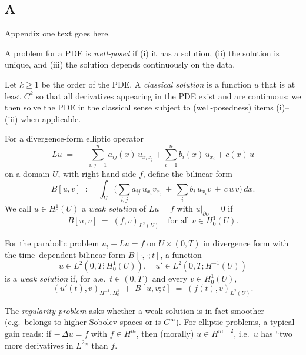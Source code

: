 \begin{appendices}
\chapter{A}
Appendix one text goes here.

\begin{definition}
A problem for a PDE is \emph{well-posed} if (i) it has a solution, (ii) the solution is unique, and (iii) the solution depends continuously on the data. 
\end{definition}

\begin{definition}
Let $k\ge 1$ be the order of the PDE. A \emph{classical solution} is a function $u$ that is at least $C^k$ so that all derivatives appearing in the PDE exist and are continuous; we then solve the PDE in the classical sense subject to (well-posedness) items (i)–(iii) when applicable.
\end{definition}

\begin{definition}
For a divergence-form elliptic operator 
\[
L u \;=\; -\sum_{i,j=1}^n a_{ij}(x)\,u_{x_i x_j} + \sum_{i=1}^n b_i(x)\,u_{x_i} + c(x)\,u
\]
on a domain $U$, with right-hand side $f$, define the bilinear form
\[
B[u,v] \;:=\; \int_U \Big(\sum_{i,j} a_{ij}\,u_{x_i} v_{x_j} \,+\, \sum_i b_i\,u_{x_i} v \,+\, c\,u\,v\Big)\,dx.
\]
We call $u\in H_0^{1}(U)$ a \emph{weak solution} of $Lu=f$ with $u|_{\partial U}=0$ if
\[
B[u,v] \;=\; (f,v)_{L^2(U)} \quad \text{for all } v\in H_0^{1}(U).
\]
\end{definition}

\begin{definition}
For the parabolic problem $u_t+L u=f$ on $U\times(0,T)$ in divergence form with the time–dependent bilinear form $B[\cdot,\cdot; t]$, a function
\[
u \in L^2(0,T; H_0^{1}(U)),\quad u' \in L^2(0,T; H^{-1}(U))
\]
is a \emph{weak solution} if, for a.e.\ $t\in(0,T)$ and every $v\in H_0^1(U)$,
\[
(u'(t),v)_{H^{-1},H_0^1} \;+\; B[u,v; t] \;=\; (f(t),v)_{L^2(U)}.
\]
\end{definition}

\begin{definition}
The \emph{regularity problem} asks whether a weak solution is in fact smoother (e.g.\ belongs to higher Sobolev spaces or is $C^\infty$). For elliptic problems, a typical gain reads: if $-\,\Delta u=f$ with $f\in H^m$, then (morally) $u\in H^{m+2}$, i.e.\ $u$ has ``two more derivatives in $L^2$'' than $f$.
\end{definition}


\end{appendices}
